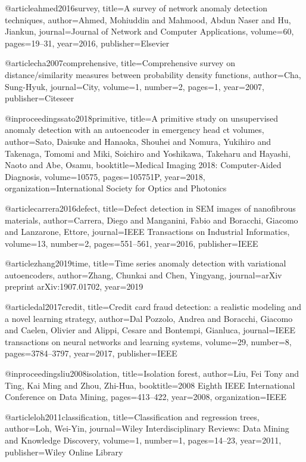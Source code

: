 @article{ahmed2016survey,
  title={A survey of network anomaly detection techniques},
  author={Ahmed, Mohiuddin and Mahmood, Abdun Naser and Hu, Jiankun},
  journal={Journal of Network and Computer Applications},
  volume={60},
  pages={19--31},
  year={2016},
  publisher={Elsevier}
}

@article{cha2007comprehensive,
  title={Comprehensive survey on distance/similarity measures between probability density functions},
  author={Cha, Sung-Hyuk},
  journal={City},
  volume={1},
  number={2},
  pages={1},
  year={2007},
  publisher={Citeseer}
}

@inproceedings{sato2018primitive,
  title={A primitive study on unsupervised anomaly detection with an autoencoder in emergency head ct volumes},
  author={Sato, Daisuke and Hanaoka, Shouhei and Nomura, Yukihiro and Takenaga, Tomomi and Miki, Soichiro and Yoshikawa, Takeharu and Hayashi, Naoto and Abe, Osamu},
  booktitle={Medical Imaging 2018: Computer-Aided Diagnosis},
  volume={10575},
  pages={105751P},
  year={2018},
  organization={International Society for Optics and Photonics}
}

@article{carrera2016defect,
  title={Defect detection in SEM images of nanofibrous materials},
  author={Carrera, Diego and Manganini, Fabio and Boracchi, Giacomo and Lanzarone, Ettore},
  journal={IEEE Transactions on Industrial Informatics},
  volume={13},
  number={2},
  pages={551--561},
  year={2016},
  publisher={IEEE}
}

@article{zhang2019time,
  title={Time series anomaly detection with variational autoencoders},
  author={Zhang, Chunkai and Chen, Yingyang},
  journal={arXiv preprint arXiv:1907.01702},
  year={2019}
}

@article{dal2017credit,
  title={Credit card fraud detection: a realistic modeling and a novel learning strategy},
  author={Dal Pozzolo, Andrea and Boracchi, Giacomo and Caelen, Olivier and Alippi, Cesare and Bontempi, Gianluca},
  journal={IEEE transactions on neural networks and learning systems},
  volume={29},
  number={8},
  pages={3784--3797},
  year={2017},
  publisher={IEEE}
}

@inproceedings{liu2008isolation,
  title={Isolation forest},
  author={Liu, Fei Tony and Ting, Kai Ming and Zhou, Zhi-Hua},
  booktitle={2008 Eighth IEEE International Conference on Data Mining},
  pages={413--422},
  year={2008},
  organization={IEEE}
}

@article{loh2011classification,
  title={Classification and regression trees},
  author={Loh, Wei-Yin},
  journal={Wiley Interdisciplinary Reviews: Data Mining and Knowledge Discovery},
  volume={1},
  number={1},
  pages={14--23},
  year={2011},
  publisher={Wiley Online Library}
}

